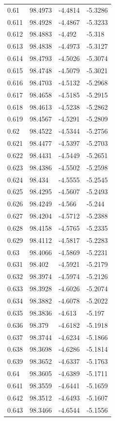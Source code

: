\begin{tabular}{llll}
0.61 & 98.4973 & -4.4814 & -5.3286 \\
0.611 & 98.4928 & -4.4867 & -5.3233 \\
0.612 & 98.4883 & -4.492 & -5.318 \\
0.613 & 98.4838 & -4.4973 & -5.3127 \\
0.614 & 98.4793 & -4.5026 & -5.3074 \\
0.615 & 98.4748 & -4.5079 & -5.3021 \\
0.616 & 98.4703 & -4.5132 & -5.2968 \\
0.617 & 98.4658 & -4.5185 & -5.2915 \\
0.618 & 98.4613 & -4.5238 & -5.2862 \\
0.619 & 98.4567 & -4.5291 & -5.2809 \\
0.62 & 98.4522 & -4.5344 & -5.2756 \\
0.621 & 98.4477 & -4.5397 & -5.2703 \\
0.622 & 98.4431 & -4.5449 & -5.2651 \\
0.623 & 98.4386 & -4.5502 & -5.2598 \\
0.624 & 98.434 & -4.5555 & -5.2545 \\
0.625 & 98.4295 & -4.5607 & -5.2493 \\
0.626 & 98.4249 & -4.566 & -5.244 \\
0.627 & 98.4204 & -4.5712 & -5.2388 \\
0.628 & 98.4158 & -4.5765 & -5.2335 \\
0.629 & 98.4112 & -4.5817 & -5.2283 \\
0.63 & 98.4066 & -4.5869 & -5.2231 \\
0.631 & 98.402 & -4.5921 & -5.2179 \\
0.632 & 98.3974 & -4.5974 & -5.2126 \\
0.633 & 98.3928 & -4.6026 & -5.2074 \\
0.634 & 98.3882 & -4.6078 & -5.2022 \\
0.635 & 98.3836 & -4.613 & -5.197 \\
0.636 & 98.379 & -4.6182 & -5.1918 \\
0.637 & 98.3744 & -4.6234 & -5.1866 \\
0.638 & 98.3698 & -4.6286 & -5.1814 \\
0.639 & 98.3652 & -4.6337 & -5.1763 \\
0.64 & 98.3605 & -4.6389 & -5.1711 \\
0.641 & 98.3559 & -4.6441 & -5.1659 \\
0.642 & 98.3512 & -4.6493 & -5.1607 \\
0.643 & 98.3466 & -4.6544 & -5.1556 \\

\end{tabular}
